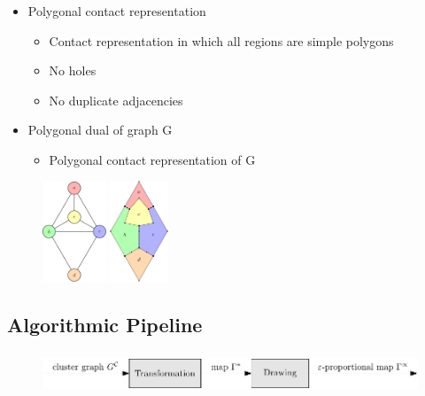 \documentclass[t,18pt]{beamer}
\begin{document}
\begin{frame}
  \frametitle{}
  \begin{itemize}
    \item Polygonal contact representation \begin{itemize}
      \item Contact representation in which all regions are simple polygons
      \item No holes
      \item No duplicate adjacencies
    \end{itemize}
    \item Polygonal dual of graph G \begin{itemize}
      \item Polygonal contact representation of G
    \end{itemize}
  \end{itemize}
  \begin{figure}
    \includegraphics[align=c,height=3cm]{../Thesis/Resources/Transformation-Algorithm-1.pdf}\quad
    \includegraphics[align=c,height=3cm]{../Thesis/Resources/Transformation-Algorithm-3.pdf}
  \end{figure}
\end{frame}

\subsection{Algorithmic Pipeline}
\label{subsect:algorithmic-pipeline-static}

\begin{frame}[c]
  \frametitle{}
  \begin{figure}
    \includegraphics[width=\textwidth]{../Thesis/Resources/Framework-1.pdf}
  \end{figure}
\end{frame}
\end{document}
